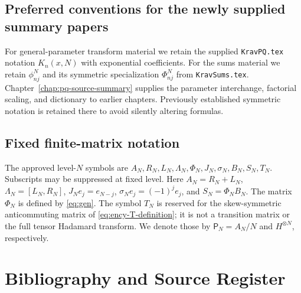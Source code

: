 \documentclass[11pt,oneside]{amsbook}
\theoremstyle{definition}
\theoremstyle{remark}
\begin{document}
\section*{Preferred conventions for the newly supplied summary papers}
For general-parameter transform material we retain the supplied
\texttt{KravPQ.tex} notation $K_n(x,N)$ with exponential coefficients.
For the sums material we retain $\phi^N_{nj}$ and its symmetric
specialization $\Phi^N_{nj}$ from \texttt{KravSums.tex}.
Chapter~\ref{chap:pq-source-summary} supplies the parameter interchange,
factorial scaling, and dictionary to earlier chapters. Previously established
symmetric notation is retained there to avoid silently altering formulas.

\section*{Fixed finite-matrix notation}
The approved level-$N$ symbols are $A_N,R_N,L_N,\Lambda_N,\Phi_N,
J_N,\sigma_N,B_N,S_N,T_N$. Subscripts may be suppressed at fixed level.
Here $A_N=R_N+L_N$, $\Lambda_N=[L_N,R_N]$,
$J_Ne_j=e_{N-j}$, $\sigma_Ne_j=(-1)^je_j$, and $S_N=\Phi_NB_N$.
The matrix $\Phi_N$ is defined by \eqref{eq:gen}.
The symbol $T_N$ is reserved for the skew-symmetric anticommuting
matrix of \eqref{eq:ency-T-definition}; it is not a transition matrix
or the full tensor Hadamard transform. We denote those by
$\mathsf P_N=A_N/N$ and $H^{\otimes N}$, respectively.

\tableofcontents

\mainmatter
\setcounter{chapter}{0}



















\appendix






\backmatter
\chapter*{Bibliography and Source Register}
\end{document}
